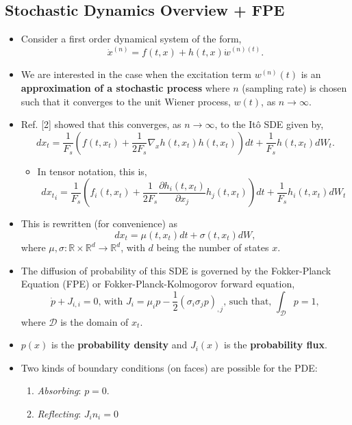 \documentclass[11pt]{article}
\makeatletter
\newcommand{\citeprocitem}[2]{\hyper@linkstart{cite}{citeproc_bib_item_#1}#2\hyper@linkend}
\makeatother
\begin{document}
\subsection{Stochastic Dynamics Overview + FPE}
\label{sec:org48d9278}
\begin{itemize}
\item Consider a first order dynamical system of the form,
$$ \dot{x}^{(n)} = f(t,x) + h(t,x)\dot{w}^{(n)(t)}. $$
\item We are interested in the case when the excitation term \(w^{(n)}(t)\) is an \textbf{approximation of a stochastic process} where \(n\) (sampling rate) is chosen such that it converges to the unit Wiener process, \(w(t)\), as \(n\to \infty\).
\item Ref. \citeprocitem{2}{[2]} showed that this converges, as \(n\to\infty\), to the Itô SDE given by,
$$ dx_t = \frac{1}{F_s} \left(f(t,x_t)+\frac{1}{2F_s} \nabla_x h(t,x_t) h(t,x_t)\right) dt + \frac{1}{F_s} h(t,x_t)dW_t. $$
\begin{itemize}
\item In tensor notation, this is,
$$ {dx_t}_i = \frac{1}{F_s}\left( f_i(t,x_t) + \frac{1}{2F_s} \frac{\partial
        h_i(t,x_t)}{\partial x_j}h_j(t,x_t)\right) dt + \frac{1}{F_s}h_i(t,x_t)
    dW_t $$
\end{itemize}
\item This is rewritten (for convenience) as
$$ dx_t = \mu(t,x_t)dt + \sigma(t,x_t)dW, $$
where \(\mu,\sigma:\mathbb{R}\times\mathbb{R}^d\to \mathbb{R}^d\), with \(d\) being the number of states \(x\).
\item The diffusion of probability of this SDE is governed by the Fokker-Planck Equation (FPE) or Fokker-Planck-Kolmogorov forward equation,
$$ \dot{p} + J_{i,i}=0,\,\text{with }J_i=\mu_ip-\frac{1}{2}(\sigma_i\sigma_j
  p)_{,j},\,\text{such that, }\int_{\mathcal{D}}p=1, $$
where \(\mathcal{D}\) is the domain of \(x_t\).
\item \(p(x)\) is the \textbf{probability density} and \(J_i(x)\) is the \textbf{probability flux}.
\item Two kinds of boundary conditions (on faces) are possible for the PDE:
\begin{enumerate}
\item \emph{Absorbing}: \(p=0\).
\item \emph{Reflecting}: \(J_i n_i=0\)
\end{enumerate}
\end{itemize}
\end{document}
